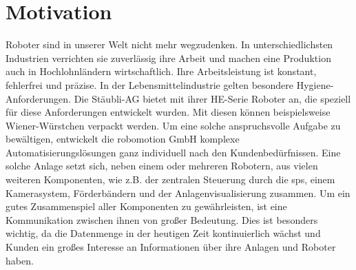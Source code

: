 \documentclass[ a4paper,
                oneside,
                toc=bibliography,
                toc=listof
                ]{scrbook}
\begin{document}
    \section{Motivation}
    Roboter sind in unserer Welt nicht mehr wegzudenken. In unterschiedlichsten Industrien verrichten sie zuverlässig ihre Arbeit und machen eine Produktion auch in Hochlohnländern wirtschaftlich. Ihre Arbeitsleistung ist konstant, fehlerfrei und präzise. In der Lebensmittelindustrie gelten besondere Hygiene-Anforderungen. Die \glqq Stäubli-AG\grqq{} bietet mit ihrer HE-Serie Roboter an, die speziell für diese Anforderungen entwickelt wurden. Mit diesen können beispielsweise Wiener-Würstchen verpackt werden. Um eine solche anspruchsvolle Aufgabe zu bewältigen, entwickelt die \glqq robomotion GmbH\grqq{} komplexe Automatisierungslösungen ganz individuell nach den Kundenbedürfnissen. Eine solche Anlage setzt sich, neben einem oder mehreren Robotern, aus vielen weiteren Komponenten, wie z.B. der zentralen Steuerung durch die \ac{sps}, einem Kamerasystem, Förderbändern und der Anlagenvisualisierung zusammen. Um ein gutes Zusammenspiel aller Komponenten zu gewährleisten, ist eine Kommunikation zwischen ihnen von großer Bedeutung. Dies ist besonders wichtig, da die Datenmenge in der heutigen Zeit kontinuierlich wächst und Kunden ein großes Interesse an Informationen über ihre Anlagen und Roboter haben.
\end{document}
